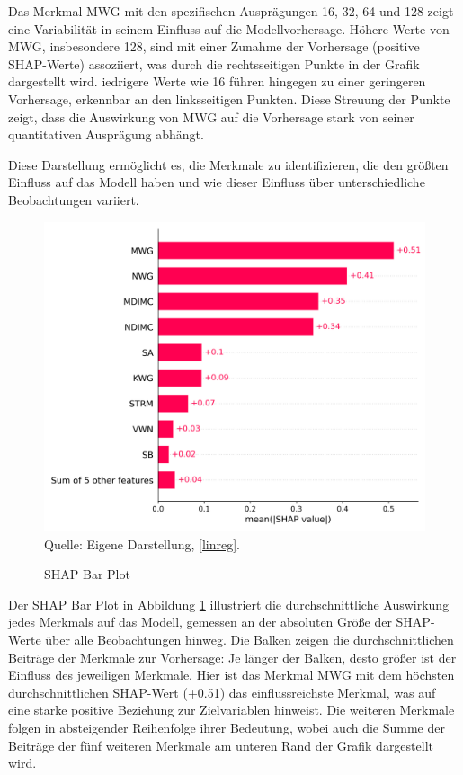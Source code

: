 Das Merkmal MWG mit den spezifischen Ausprägungen 16, 32, 64 und 128 zeigt eine Variabilität 
in seinem Einfluss auf die Modellvorhersage. Höhere Werte von MWG, insbesondere 128, 
sind mit einer Zunahme der Vorhersage (positive SHAP-Werte) assoziiert, 
was durch die rechtsseitigen Punkte in der Grafik dargestellt wird. 
iedrigere Werte wie 16 führen hingegen zu einer geringeren Vorhersage, 
erkennbar an den linksseitigen Punkten. Diese Streuung der Punkte zeigt, 
dass die Auswirkung von MWG auf die Vorhersage stark von seiner quantitativen Ausprägung abhängt.

Diese Darstellung ermöglicht es, die Merkmale zu identifizieren, 
die den größten Einfluss auf das Modell haben und wie dieser Einfluss über 
unterschiedliche Beobachtungen variiert.

\begin{figure}[!h]
    \caption{SHAP Bar Plot}
    \includegraphics[width=1\textwidth]{../scripts/images/shap_bar_plot_gpu.png}
    Quelle: Eigene Darstellung, \ref{linreg}.
    \label{pic:shap_bar}
\end{figure}

Der SHAP Bar Plot in Abbildung \ref{pic:shap_bar} illustriert die durchschnittliche 
Auswirkung jedes Merkmals auf das Modell, gemessen an der absoluten Größe der SHAP-Werte 
über alle Beobachtungen hinweg. Die Balken zeigen die durchschnittlichen Beiträge der 
Merkmale zur Vorhersage: Je länger der Balken, desto größer ist der Einfluss des jeweiligen Merkmale. 
Hier ist das Merkmal MWG mit dem höchsten durchschnittlichen SHAP-Wert (+0.51) das einflussreichste 
Merkmal, was auf eine starke positive Beziehung zur Zielvariablen hinweist. Die weiteren Merkmale 
folgen in absteigender Reihenfolge ihrer Bedeutung, wobei auch die Summe der Beiträge der 
fünf weiteren Merkmale am unteren Rand der Grafik dargestellt wird.
